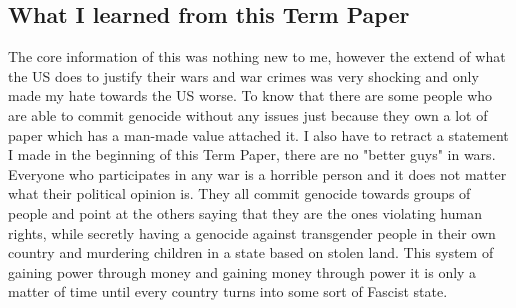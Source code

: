 \subsection{What I learned from this Term Paper}
The core information of this was nothing new to me, however the extend of what the US does to justify their wars and war crimes was very shocking and only made my hate towards the US worse.
To know that there are some people who are able to commit genocide without any issues just because they own a lot of paper which has a man-made value attached it.
I also have to retract a statement I made in the beginning of this Term Paper, there are no "better guys" in wars. Everyone who participates in any war is a horrible person and it does not matter what their political opinion is. They all commit genocide towards groups of people and point at the others saying that they are the ones violating human rights, while secretly having a genocide against transgender people in their own country and murdering children in a state based on stolen land.
This system of gaining power through money and gaining money through power it is only a matter of time until every country turns into some sort of Fascist state.